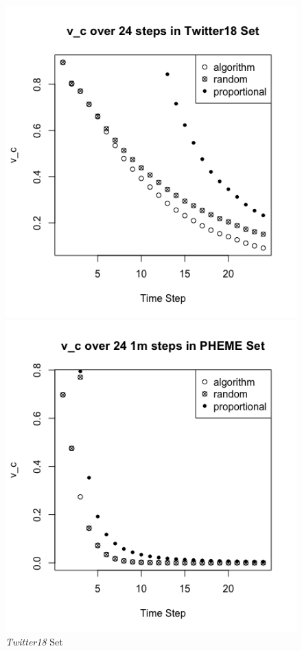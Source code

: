 \documentclass[preprint,12pt]{elsarticle}
\begin{document}
\begin{figure}[h]
\centering
{}
  \includegraphics[width=\linewidth]{v_c in Twitter18.png}
    \caption{\textit{Twitter18} Set}
    \label{fig:mu6 Twitter18}
\endminipage\hfill
{}
  \includegraphics[width=\linewidth]{v_c PHEME 1m.png}

\end{figure}
\end{document}
